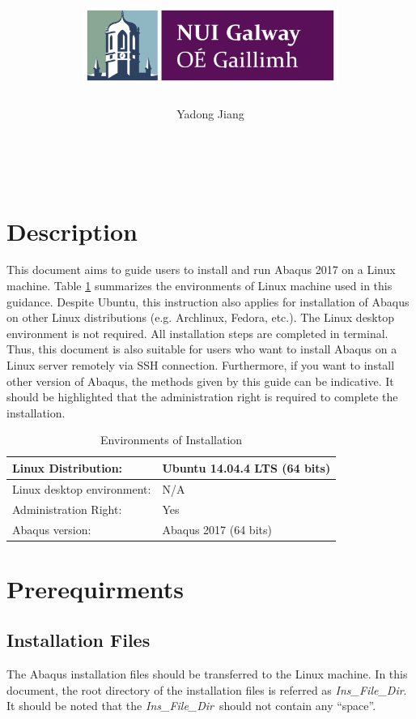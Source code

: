 \documentclass[12pt]{article}
\title{\includegraphics[height=1in]{Figures/NUIG_Logo.jpg} \vspace{100pt} \\ \tit}
\author[1]{Yadong Jiang}
\affil[1]{College of Engineering and Informatics, National University of Ireland Galway}
\date{}
\newcommand{\ifp}{\textit{Ins\_File\_Dir}}
\begin{document}
\maketitle

\newpage
\ 
\section*{Description}
This document aims to guide users to install and run Abaqus 2017 on a Linux machine. Table \ref{tb-1} summarizes the environments of Linux machine used in this guidance. Despite Ubuntu, this instruction also applies for installation of Abaqus on other Linux distributions (e.g. Archlinux, Fedora, etc.). The Linux desktop environment is not required. All installation steps are completed in terminal. Thus, this document is also suitable for users who want to install Abaqus on a Linux server remotely via SSH connection. Furthermore, if you want to install other version of Abaqus, the methods given by this guide can be indicative. It should be highlighted that the administration right is required to complete the installation.

\begin{table}[h!]
\caption{Environments of Installation}
\begin{center}
\begin{tabular}{l l}
    \hline
    Linux Distribution: & Ubuntu 14.04.4 LTS (64 bits)\\
    \hline
    Linux desktop environment: & N/A \\
    \hline
    Administration Right: & Yes \\
    \hline
    Abaqus version: & Abaqus 2017 (64 bits) \\
    \hline
\end{tabular}
\end{center}
\label{tb-1}
\end{table}

\section*{Prerequirments}
\subsection*{Installation Files}
The Abaqus installation files should be transferred to the Linux machine. In this document, the root directory of the installation files is referred as \ifp. It should be noted that the \ifp\ should not contain any ``space''.
\end{document}
